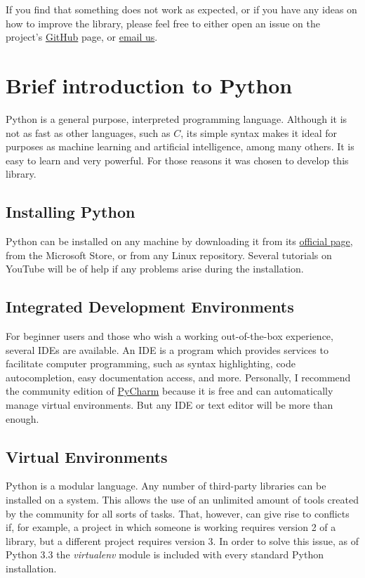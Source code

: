 \documentclass[a4paper,12pt]{article}
\begin{document}
If you find that something does not work as expected, or if you have any ideas on how to improve the library, please feel free to either open an issue on the project's \href{https://github.com/JuodaanViinaa/Laboratorio}{GitHub} page, or \href{mailto:maldonadodaniel96@outlook.com}{email us}.

\newpage
\section{Brief introduction to Python}

Python is a general purpose, interpreted programming language. Although it is not as fast as other languages, such as $C$, its simple syntax makes it ideal for purposes as machine learning and artificial intelligence, among many others. It is easy to learn and very powerful. For those reasons it was chosen to develop this library.

\subsection{Installing Python}

Python can be installed on any machine by downloading it from its \href{https://www.python.org/}{official page}, from the Microsoft Store, or from any Linux repository. Several tutorials on YouTube will be of help if any problems arise during the installation.

\subsection{Integrated Development Environments}

For beginner users and those who wish a working out-of-the-box experience, several IDEs are available. An IDE is a program which provides services to facilitate computer programming, such as syntax highlighting, code autocompletion, easy documentation access, and more. Personally, I recommend the community edition of \href{https://www.jetbrains.com/pycharm/download/}{PyCharm} because it is free and can automatically manage virtual environments. But any IDE or text editor will be more than enough.

\subsection{Virtual Environments}

Python is a modular language. Any number of third-party libraries can be installed on a system. This allows the use of an unlimited amount of tools created by the community for all sorts of tasks. That, however, can give rise to conflicts if, for example, a project in which someone is working requires version 2 of a library, but a different project requires version 3. In order to solve this issue, as of Python 3.3 the {\slshape virtualenv} module is included with every standard Python installation.
\end{document}
